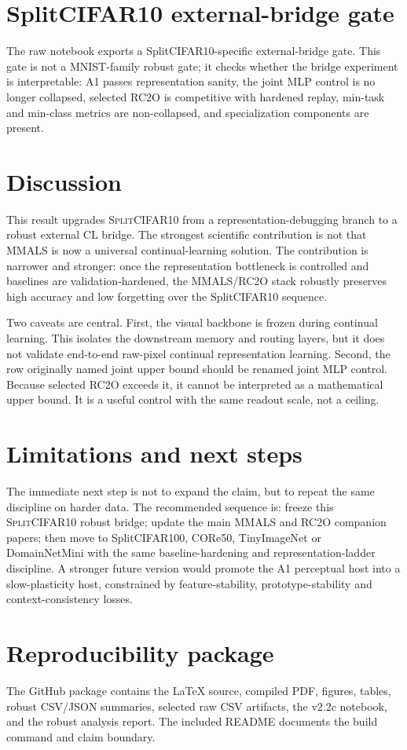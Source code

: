 \documentclass[11pt]{article}
\newcommand{\mmals}{\textsc{MMALS}}
\newcommand{\rc}{\textsc{RC2O}}
\newcommand{\splitcifar}{\textsc{SplitCIFAR10}}
\begin{document}
\section{SplitCIFAR10 external-bridge gate}
The raw notebook exports a SplitCIFAR10-specific external-bridge gate. This gate is not a MNIST-family robust gate; it checks whether the bridge experiment is interpretable: A1 passes representation sanity, the joint MLP control is no longer collapsed, selected RC2O is competitive with hardened replay, min-task and min-class metrics are non-collapsed, and specialization components are present.

\begin{table}[H]
\centering
\caption{SplitCIFAR10 external-bridge gate.}

\end{table}

\section{Discussion}
This result upgrades \splitcifar{} from a representation-debugging branch to a robust external CL bridge. The strongest scientific contribution is not that \mmals{} is now a universal continual-learning solution. The contribution is narrower and stronger: once the representation bottleneck is controlled and baselines are validation-hardened, the \mmals{}/\rc{} stack robustly preserves high accuracy and low forgetting over the SplitCIFAR10 sequence.

Two caveats are central. First, the visual backbone is frozen during continual learning. This isolates the downstream memory and routing layers, but it does not validate end-to-end raw-pixel continual representation learning. Second, the row originally named joint upper bound should be renamed joint MLP control. Because selected \rc{} exceeds it, it cannot be interpreted as a mathematical upper bound. It is a useful control with the same readout scale, not a ceiling.

\section{Limitations and next steps}
The immediate next step is not to expand the claim, but to repeat the same discipline on harder data. The recommended sequence is: freeze this \splitcifar{} robust bridge; update the main \mmals{} and \rc{} companion papers; then move to SplitCIFAR100, CORe50, TinyImageNet or DomainNetMini with the same baseline-hardening and representation-ladder discipline. A stronger future version would promote the A1 perceptual host into a slow-plasticity host, constrained by feature-stability, prototype-stability and context-consistency losses.

\section{Reproducibility package}
The GitHub package contains the LaTeX source, compiled PDF, figures, tables, robust CSV/JSON summaries, selected raw CSV artifacts, the v2.2c notebook, and the robust analysis report. The included README documents the build command and claim boundary.



\end{document}
